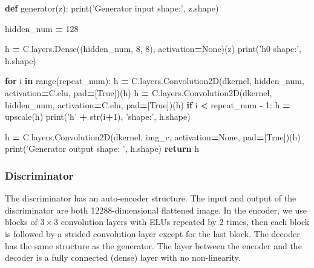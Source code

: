 \documentclass[]{book}
\newenvironment{Shaded}{\begin{snugshade}}{\end{snugshade}}
\newcommand{\KeywordTok}[1]{\textcolor[rgb]{0.13,0.29,0.53}{\textbf{#1}}}
\newcommand{\DecValTok}[1]{\textcolor[rgb]{0.00,0.00,0.81}{#1}}
\newcommand{\StringTok}[1]{\textcolor[rgb]{0.31,0.60,0.02}{#1}}
\newcommand{\VariableTok}[1]{\textcolor[rgb]{0.00,0.00,0.00}{#1}}
\newcommand{\ControlFlowTok}[1]{\textcolor[rgb]{0.13,0.29,0.53}{\textbf{#1}}}
\newcommand{\OperatorTok}[1]{\textcolor[rgb]{0.81,0.36,0.00}{\textbf{#1}}}
\newcommand{\BuiltInTok}[1]{#1}
\newcommand{\NormalTok}[1]{#1}
\theoremstyle{definition}
\theoremstyle{definition}
\theoremstyle{definition}
\theoremstyle{remark}
\begin{document}
\begin{Shaded}
\begin{Highlighting}[]
\KeywordTok{def}\NormalTok{ generator(z):}
    \BuiltInTok{print}\NormalTok{(}\StringTok{'Generator input shape:'}\NormalTok{, z.shape)}
    
\NormalTok{    hidden_num }\OperatorTok{=} \DecValTok{128}
    
\NormalTok{    h }\OperatorTok{=}\NormalTok{ C.layers.Dense((hidden_num, }\DecValTok{8}\NormalTok{, }\DecValTok{8}\NormalTok{), activation}\OperatorTok{=}\VariableTok{None}\NormalTok{)(z)}
    \BuiltInTok{print}\NormalTok{(}\StringTok{'h0 shape:'}\NormalTok{, h.shape)}
    
    \ControlFlowTok{for}\NormalTok{ i }\KeywordTok{in} \BuiltInTok{range}\NormalTok{(repeat_num):}
\NormalTok{        h }\OperatorTok{=}\NormalTok{ C.layers.Convolution2D(dkernel, hidden_num, activation}\OperatorTok{=}\NormalTok{C.elu, pad}\OperatorTok{=}\NormalTok{[}\VariableTok{True}\NormalTok{])(h)}
\NormalTok{        h }\OperatorTok{=}\NormalTok{ C.layers.Convolution2D(dkernel, hidden_num, activation}\OperatorTok{=}\NormalTok{C.elu, pad}\OperatorTok{=}\NormalTok{[}\VariableTok{True}\NormalTok{])(h)}
        \ControlFlowTok{if}\NormalTok{ i }\OperatorTok{<}\NormalTok{ repeat_num }\OperatorTok{-} \DecValTok{1}\NormalTok{:}
\NormalTok{            h }\OperatorTok{=}\NormalTok{ upscale(h)}
        \BuiltInTok{print}\NormalTok{(}\StringTok{'h'} \OperatorTok{+} \BuiltInTok{str}\NormalTok{(i}\OperatorTok{+}\DecValTok{1}\NormalTok{), }\StringTok{'shape:'}\NormalTok{, h.shape)}
        
\NormalTok{    h }\OperatorTok{=}\NormalTok{ C.layers.Convolution2D(dkernel, img_c, activation}\OperatorTok{=}\VariableTok{None}\NormalTok{, pad}\OperatorTok{=}\NormalTok{[}\VariableTok{True}\NormalTok{])(h)}
    \BuiltInTok{print}\NormalTok{(}\StringTok{'Generator output shape: '}\NormalTok{, h.shape)}
    \ControlFlowTok{return}\NormalTok{ h}
\end{Highlighting}
\end{Shaded}

\subsubsection{Discriminator}\label{discriminator-1}

The discriminator has an auto-encoder structure. The input and output of
the discriminator are both 12288-dimensional flattened image. In the
encoder, we use blocks of \(3\times3\) convolution layers with ELUs
repeated by 2 times, then each block is followed by a strided
convolution layer except for the last block. The decoder has the same
structure as the generator. The layer between the encoder and the
decoder is a fully connected (dense) layer with no non-linearity.
\end{document}

